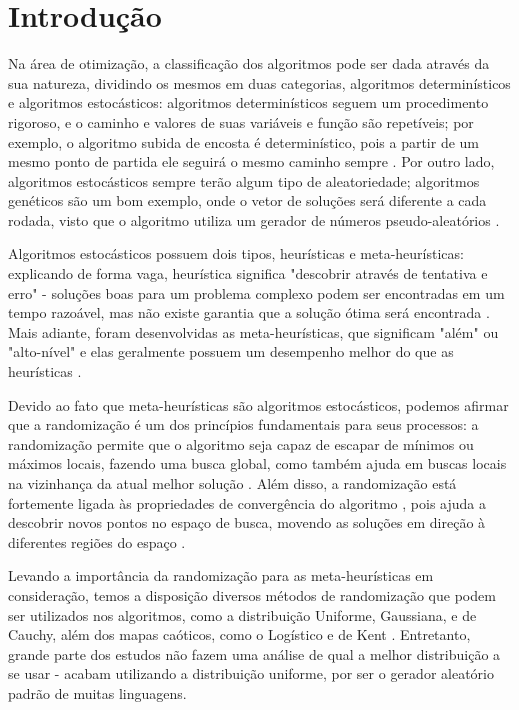\chapter{Introdução}
\label{cap:introducao}

Na área de otimização, a classificação dos algoritmos pode ser dada através da sua natureza, dividindo os mesmos em duas categorias, algoritmos determinísticos e algoritmos estocásticos: algoritmos determinísticos seguem um procedimento rigoroso, e o caminho e valores de suas variáveis e função são repetíveis; por exemplo, o algoritmo subida de encosta é determinístico, pois a partir de um mesmo ponto de partida ele seguirá o mesmo caminho sempre \cite{yang}. Por outro lado, algoritmos estocásticos sempre terão algum tipo de aleatoriedade; algoritmos genéticos são um bom exemplo, onde o vetor de soluções será diferente a cada rodada, visto que o algoritmo utiliza um gerador de números pseudo-aleatórios \cite{yang}.

Algoritmos estocásticos possuem dois tipos, heurísticas e meta-heurísticas: explicando de forma vaga, heurística significa "descobrir através de tentativa e erro" \- - soluções boas para um problema complexo podem ser encontradas em um tempo razoável, mas não existe garantia que a solução ótima será encontrada \cite{yang}. Mais adiante, foram desenvolvidas as meta-heurísticas, que significam "além" ou "alto-nível" e elas geralmente possuem um desempenho melhor do que as heurísticas \cite{yang}.

Devido ao fato que meta-heurísticas são algoritmos estocásticos, podemos afirmar que a randomização é um dos princípios fundamentais para seus processos: a randomização permite que o algoritmo seja capaz de escapar de mínimos ou máximos locais, fazendo uma busca global, como também ajuda em buscas locais na vizinhança da atual melhor solução \cite{yang2}. Além disso, a randomização está fortemente ligada às propriedades de convergência do algoritmo \cite{caponetto}, pois ajuda a descobrir novos pontos no espaço de busca, movendo as soluções em direção à diferentes regiões do espaço \cite{fister}.

Levando a importância da randomização para as meta-heurísticas em consideração, temos a disposição diversos métodos de randomização que podem ser utilizados nos algoritmos, como a distribuição Uniforme, Gaussiana, e de Cauchy, além dos mapas caóticos, como o Logístico e de Kent \cite{fister}. Entretanto, grande parte dos estudos não fazem uma análise de qual a melhor distribuição a se usar - acabam utilizando a distribuição uniforme, por ser o gerador aleatório padrão de muitas linguagens.


